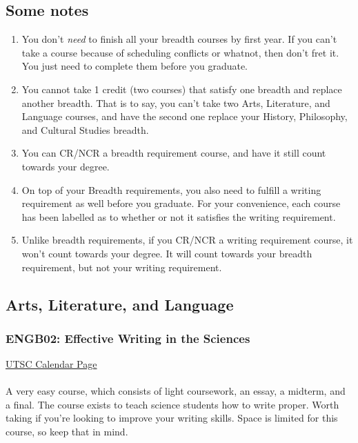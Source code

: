 \documentclass[11pt]{article}
\begin{document}
\subsection{Some notes}
\begin{enumerate}
\item You don't \textit{need} to finish all your breadth courses by first year.  If you can't take a course because of scheduling conflicts or whatnot, then don't fret it.  You just need to complete them before you graduate.

\item You cannot take 1 credit (two courses) that satisfy one breadth and replace another breadth.  That is to say, you can't take two Arts, Literature, and Language courses, and have the second one replace your History, Philosophy, and Cultural Studies breadth.

\item You can CR/NCR a breadth requirement course, and have it still count towards your degree.

\item On top of your Breadth requirements, you also need to fulfill a writing requirement as well before you graduate.  For your convenience, each course has been labelled as to whether or not it satisfies the writing requirement.

\item Unlike breadth requirements, if you CR/NCR a writing requirement course, it won't count towards your degree.  It will count towards your breadth requirement, but not your writing requirement.
\end{enumerate}

\subsection{Arts, Literature, and Language}
\subsubsection{ENGB02: Effective Writing in the Sciences}

\href{https://utsc.calendar.utoronto.ca/course/engb02h3}{UTSC Calendar Page}\\\\

A very easy course, which consists of light coursework, an essay, a midterm, and a final.  The course exists to teach science students how to write proper.  Worth taking if you're looking to improve your writing skills.  Space is limited for this course, so keep that in mind.\\
\end{document}
